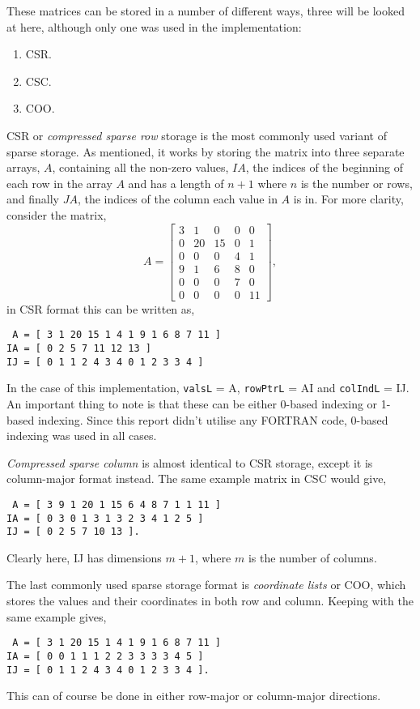These matrices can be stored in a number of different ways, three will be looked at here, although only one was used in the implementation:
\begin{enumerate}
	\item CSR.
	\item CSC.
	\item COO.
\end{enumerate}
CSR or \textit{compressed sparse row} storage is the most commonly used variant of sparse storage. As mentioned, it works by storing the matrix into three separate arrays, $A$, containing all the non-zero values, $IA$, the indices of the beginning of each row in the array $A$ and has a length of $n+1$ where $n$ is the number or rows, and finally $JA$, the indices of the column each value in $A$ is in. For more clarity, consider the matrix,
\begin{equation}
	A = 
	\left[\begin{matrix}
		3 & 1 & 0 & 0 & 0\\
		0 & 20 & 15 & 0 & 1\\
		0 & 0 & 0 & 4 & 1\\
		9 & 1 & 6 & 8 & 0\\
		0 & 0 & 0 & 7 & 0\\
		0 & 0 & 0 & 0 & 11
	\end{matrix}\right],
\end{equation}
in CSR format this can be written as,
\begin{lstlisting}
 A = [ 3 1 20 15 1 4 1 9 1 6 8 7 11 ]
IA = [ 0 2 5 7 11 12 13 ]
IJ = [ 0 1 1 2 4 3 4 0 1 2 3 3 4 ]
\end{lstlisting}
In the case of this implementation, \texttt{valsL} = A, \texttt{rowPtrL} = AI and \texttt{colIndL} = IJ. An important thing to note is that these can be either 0-based indexing or 1-based indexing. Since this report didn't utilise any FORTRAN code, 0-based indexing was used in all cases.

\textit{Compressed sparse column} is almost identical to CSR storage, except it is column-major format instead. The same example matrix in CSC would give,
\begin{lstlisting}
 A = [ 3 9 1 20 1 15 6 4 8 7 1 1 11 ]
IA = [ 0 3 0 1 3 1 3 2 3 4 1 2 5 ]
IJ = [ 0 2 5 7 10 13 ].
\end{lstlisting}
Clearly here, IJ has dimensions $m+1$, where $m$ is the number of columns.

The last commonly used sparse storage format is \textit{coordinate lists} or COO, which stores the values and their coordinates in both row and column. Keeping with the same example gives,
\begin{lstlisting}
 A = [ 3 1 20 15 1 4 1 9 1 6 8 7 11 ]
IA = [ 0 0 1 1 1 2 2 3 3 3 3 4 5 ]
IJ = [ 0 1 1 2 4 3 4 0 1 2 3 3 4 ].
\end{lstlisting}
This can of course be done in either row-major or column-major directions.

